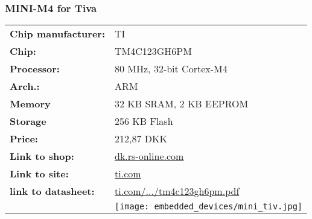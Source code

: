 \subsubsection*{MINI-M4 for Tiva}
\begin{tabular}{ l l }

	\textbf{Chip manufacturer:} &
	TI \\

	\textbf{Chip:} &
	TM4C123GH6PM \\

	\textbf{Processor:} &
	80 MHz, 32-bit Cortex-M4 \\

	\textbf{Arch.:} &
	ARM \\

	\textbf{Memory} &
	32 KB SRAM, 2 KB EEPROM\\

	\textbf{Storage} &
	256 KB Flash \\

	\textbf{Price:} &
	212,87 DKK \\

	\textbf{Link to shop:} &
	\href{http://dk.rs-online.com/web/p/processor-og-mikrocontroller-udviklingssaet/8829017/}{dk.rs-online.com} \\

	\textbf{Link to site:} &
	\href{http://www.ti.com/product/TM4C123GH6PM}{ti.com} \\

	\textbf{link to datasheet:} &
	\href{http://www.ti.com/lit/ds/symlink/tm4c123gh6pm.pdf}{ti.com/.../tm4c123gh6pm.pdf} \\

	&
	\texttt{[image: embedded\_devices/mini\_tiv.jpg]} \\

\end{tabular}


